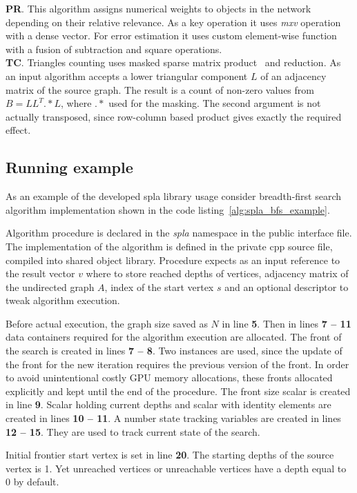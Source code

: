 \textbf{PR}. This algorithm assigns numerical weights to objects in the network depending on their relative relevance. As a key operation it uses \textit{mxv} operation with a dense vector. For error estimation it uses custom element-wise function with a fusion of subtraction and square operations.\\  

\textbf{TC}. Triangles counting uses masked sparse matrix product~\cite{yang2019graphblast} and reduction. As an input algorithm accepts a lower triangular component $L$ of an adjacency matrix of the source graph. The result is a count of non-zero values from $B = LL^T .* L$, where $.*$ used for the masking. The second argument is not actually transposed, since row-column based product gives exactly the required effect.

\subsection{Running example}

As an example of the developed spla library usage consider breadth-first search algorithm implementation shown in the code listing~\ref{alg:spla_bfs_example}. 

Algorithm procedure is declared in the \textit{spla} namespace in the public interface file. The implementation of the algorithm is defined in the private cpp source file, compiled into shared object library. Procedure expects as an input reference to the result vector $v$ where to store reached depths of vertices, adjacency matrix of the undirected graph $A$, index of the start vertex $s$ and an optional descriptor to tweak algorithm execution.

Before actual execution, the graph size saved as $N$ in line \textbf{5}. Then in lines \textbf{7 -- 11} data containers required for the algorithm execution are allocated. The front of the search is created in lines \textbf{7 -- 8}. Two instances are used, since the update of the front for the new iteration requires the previous version of the front. In order to avoid unintentional costly GPU memory allocations, these fronts allocated explicitly and kept until the end of the procedure. The front size scalar is created in line \textbf{9}. Scalar holding current depths and scalar with identity elements are created in lines \textbf{10 -- 11}. A number state tracking variables are created in lines \textbf{12 -- 15}. They are used to track current state of the search.

Initial frontier start vertex is set in line \textbf{20}. The starting depths of the source vertex is 1. Yet unreached vertices or unreachable vertices have a depth equal to 0 by default.


